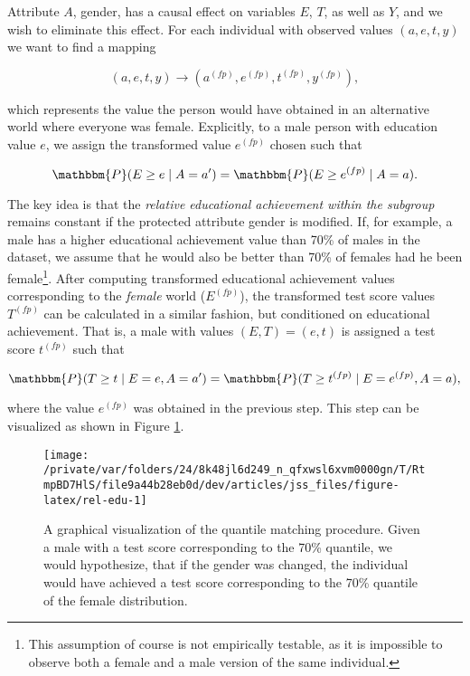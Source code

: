 \documentclass[
  nojss]{jss}
\begin{document}
Attribute \(A\), gender, has a causal effect on variables \(E\), \(T\),
as well as \(Y\), and we wish to eliminate this effect. For each
individual with observed values \((a, e, t, y)\) we want to find a
mapping

\[(a, e, t, y) \longrightarrow  ( {a}^{(fp)},  {e}^{(fp)},  {t}^{(fp)},  {y}^{(fp)}),\]

which represents the value the person would have obtained in an
alternative world where everyone was female. Explicitly, to a male
person with education value \(e\), we assign the transformed value
\( {e}^{(fp)}\) chosen such that

\[\mathbbm{P}(E \geq e \mid A = a') = \mathbbm{P}(E \geq  {e}^{(fp)} \mid A = a).\]

The key idea is that the \emph{relative educational achievement within
the subgroup} remains constant if the protected attribute gender is
modified. If, for example, a male has a higher educational achievement
value than 70\% of males in the dataset, we assume that he would also be
better than 70\% of females had he been female\footnote{This assumption
  of course is not empirically testable, as it is impossible to observe
  both a female and a male version of the same individual.}. After
computing transformed educational achievement values corresponding to
the \emph{female} world (\( {E}^{(fp)}\)), the transformed test score
values \( {T}^{(fp)}\) can be calculated in a similar fashion, but
conditioned on educational achievement. That is, a male with values
\((E, T) = (e, t)\) is assigned a test score \( {t}^{(fp)}\) such that

\[\mathbbm{P}(T \geq t \mid E = e, A = a') = \mathbbm{P}(T \geq  {t}^{(fp)} \mid E =  {e}^{(fp)}, A = a),\]

where the value \( {e}^{(fp)}\) was obtained in the previous step. This
step can be visualized as shown in Figure \ref{fig:rel-edu}.

\begin{CodeChunk}
\begin{figure}

{\centering \texttt{[image: /private/var/folders/24/8k48jl6d249\_n\_qfxwsl6xvm0000gn/T/RtmpBD7HlS/file9a44b28eb0d/dev/articles/jss\_files/figure-latex/rel-edu-1]} 

}

\caption[A graphical visualization of the quantile matching procedure]{A graphical visualization of the quantile matching procedure. Given a male with a test score corresponding to the 70\% quantile, we would hypothesize, that if the gender was changed, the individual would have achieved a test score corresponding to the 70\% quantile of the female distribution.}\label{fig:rel-edu}
\end{figure}
\end{CodeChunk}
\end{document}
